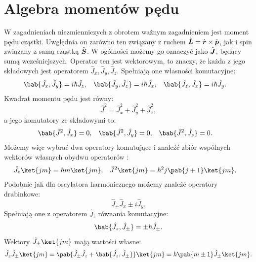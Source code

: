 
\section{Algebra momentów pędu}
W zagadnieniach niezmienniczych z obrotem ważnym zagadnieniem jest moment pędu cząstki. Uwględnia on zarówno ten związany z ruchem \(\vu{L} = \vu{r} \times \vu{p}\), jak i spin związany z samą cząstką \(\vu{S}\). W ogólności możemy go oznaczyć jako \(\vu{J}\), będący sumą wcześniejszych. Operator ten jest wektorowym, to znaczy, że każda z jego składowych jest operatorem \(\hat{J}_x, \hat{J}_y, \hat{J}_z\). Spełniają one własności komutacyjne:
\begin{align}\label{eq:def_J_kom}
	\bab{\hat{J}_x, \hat{J}_y} &= i\hbar \hat{J}_z, &
	\bab{\hat{J}_y, \hat{J}_z} &= i\hbar \hat{J}_x, &
	\bab{\hat{J}_z, \hat{J}_x} &= i\hbar \hat{J}_y.
\end{align}
Kwadrat momentu pędu jest równy:
\begin{equation}
	\hat{J}^2 = \hat{J}_x^2 + \hat{J}_y^2 + \hat{J}_z^2,
\end{equation}
a jego komutatory ze składowymi to:
\begin{align}\label{eq:def_J2_kom}
	\bab{\hat{J}^2, \hat{J}_x} &= 0, &
	\bab{\hat{J}^2, \hat{J}_y} &= 0, &
	\bab{\hat{J}^2, \hat{J}_z} &= 0.
\end{align}
Możemy więc wybrać dwa operatory komutujące i znaleźć zbiór wspólnych wektorów własnych obydwu operatorów \cite{davydov_mechanika_kwantowa}:
\begin{align}\label{eq:def_J_wlasne}
	\hat{J}_z \ket{jm} &= \hbar m \ket{jm}, &
	\hat{J}^2 \ket{jm} &= \hbar^2 j\pab{j+1} \ket{jm}.
\end{align}
Podobnie jak dla oscylatora harmonicznego możemy znaleźć operatory drabinkowe:
\begin{equation}\label{eq:def_J_drabinkowe}
	\hat{J}_{\pm} \hat{J}_x \pm i\hat{J}_y.
\end{equation}
Spełniają one z operatorem \(\hat{J}_z\) równania komutacyjne:
\begin{equation}
	\bab{\hat{J}_z, \hat{J}_{\pm}} = \pm \hbar \hat{J}_{\pm}.
\end{equation}
Wektory \(\hat{J}_{\pm} \ket{jm}\) mają wartości własne:
\begin{equation}
	\hat{J}_z \hat{J}_{\pm} \ket{jm} =
	\pab{\hat{J}_{\pm} \hat{J}_z + \bab{\hat{J}_z, \hat{J}_{\pm}}} \ket{jm} =
	\hbar \pab{m \pm 1} \hat{J}_{\pm} \ket{jm}.
\end{equation}
